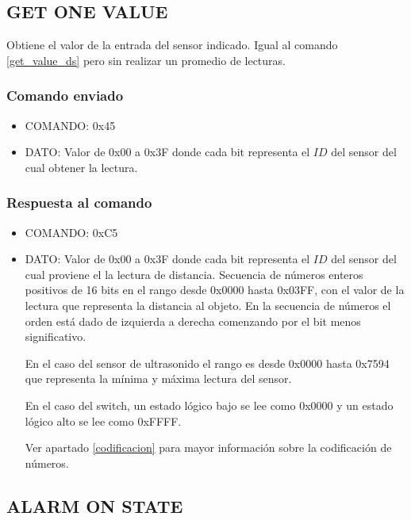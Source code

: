 \documentclass[a4paper,10pt]{article}
\begin{document}
\subsection{GET ONE VALUE}
\label{get_one_value_ds}

Obtiene el valor de la entrada del sensor indicado.
Igual al comando \ref{get_value_ds} pero sin realizar un promedio de lecturas.

\subsubsection*{Comando enviado}

\begin{itemize}
	\item{COMANDO:} 0x45
	\item{DATO:} Valor de 0x00 a 0x3F donde cada bit representa el $ID$ del sensor del cual obtener la lectura.
\end{itemize}

\subsubsection*{Respuesta al comando}

\begin{itemize}
	\item{COMANDO:} 0xC5
	\item{DATO:} Valor de 0x00 a 0x3F donde cada bit representa el $ID$ del sensor del cual proviene el la lectura de distancia.
	Secuencia de n\'umeros enteros positivos de 16 bits en el rango desde 0x0000 hasta 0x03FF, con el valor de la lectura que representa la distancia al objeto.
	En la secuencia de n\'umeros el orden est\'a dado de izquierda a derecha comenzando por el bit menos significativo.

	En el caso del sensor de ultrasonido el rango es desde 0x0000 hasta 0x7594 que representa la m\'inima y m\'axima lectura del sensor.

	En el caso del switch, un estado l\'ogico bajo se lee como 0x0000 y un estado l\'ogico alto se lee como 0xFFFF.

	Ver apartado \ref{codificacion} para mayor informaci\'on sobre la codificaci\'on de n\'umeros.
\end{itemize}

\subsection{ALARM ON STATE}
\label{alarm_on_state_ds}
\end{document}
